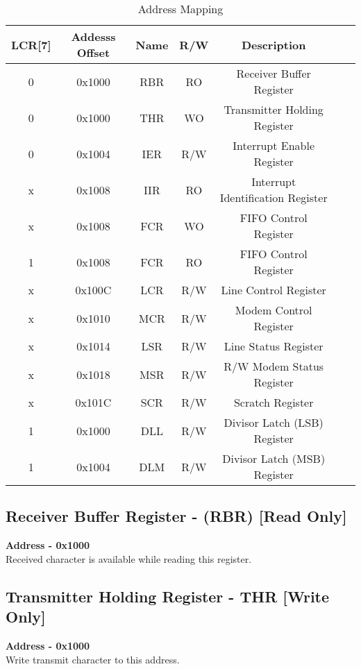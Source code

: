 \documentclass[12pt,a4paper]{report}
\begin{document}
\begin{table} [ht]
\begin{center}
\begin{tabular}{|c|c|c|c|c|c|c| } 
 \hline
LCR[7]  &  Addesss Offset & Name & R/W & Description  \\ 
 \hline
0 & 0x1000 &  RBR &  RO &  Receiver Buffer Register \\
 \hline
0 & 0x1000  & THR &  WO  & Transmitter Holding Register \\
 \hline
0 &  0x1004 &  IER &  R/W &  Interrupt Enable Register \\
 \hline
x &  0x1008 &  IIR  & RO &  Interrupt Identification Register \\
 \hline
x &  0x1008 &  FCR  & WO &  FIFO Control Register \\
 \hline
1 &  0x1008 &  FCR  & RO &  FIFO Control Register \\
 \hline
x &  0x100C &  LCR  & R/W &  Line Control Register \\
 \hline
x &  0x1010 &  MCR  & R/W &  Modem Control Register \\
 \hline
x &  0x1014 &  LSR &  R/W &  Line Status Register \\
 \hline
x &  0x1018 &  MSR & R/W  &  R/W Modem Status Register \\
 \hline
x &  0x101C &  SCR &  R/W  & Scratch Register \\
 \hline
1 &  0x1000  & DLL  & R/W  & Divisor Latch (LSB) Register \\
 \hline
1 &  0x1004 &  DLM  & R/W  & Divisor Latch (MSB) Register \\
\hline
\end{tabular}
\caption{\label{tab:uart_space} Address Mapping}
\end{center}
\end{table}


\subsection{Receiver Buffer Register - (RBR) [Read Only] }
\hspace{1.6cm}
\textbf{Address - 0x1000}
\\
\hspace{1.6cm}
Received character is available while reading this register.

\subsection{Transmitter Holding Register - THR [Write Only] }
\hspace{1.6cm}
\textbf{Address - 0x1000}
\\
\hspace{1.6cm}
Write transmit character  to this address. 
\end{document}
